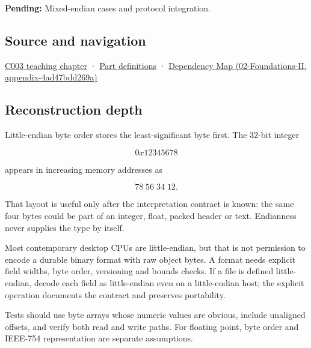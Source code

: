 \textbf{Pending:} Mixed-endian cases and protocol integration.

\subsection{Source and navigation}\label{source-and-navigation}

\href{Continuous\%20Notes/Computing\%20Foundations\%20-\%20From\%20Bits\%20to\%20C++\%20and\%20Systems\%20APIs\#Where\%20the\%20bytes\%20live}{C003 teaching chapter} · \hyperref[appendix-fd090d982a15]{Part definitions} · \href{}{Dependency Map (02-Foundations-II, appendix-4ad47bdd269a)}

\subsection{Reconstruction depth}\label{reconstruction-depth}

Little-endian byte order stores the least-significant byte first. The 32-bit integer

\[
0x12345678
\]

appears in increasing memory addresses as

\[
78\;56\;34\;12.
\]

That layout is useful only after the interpretation contract is known: the same four bytes could be part of an integer, float, packed header or text. Endianness never supplies the type by itself.

Most contemporary desktop CPUs are little-endian, but that is not permission to encode a durable binary format with raw object bytes. A format needs explicit field widths, byte order, versioning and bounds checks. If a file is defined little-endian, decode each field as little-endian even on a little-endian host; the explicit operation documents the contract and preserves portability.

Tests should use byte arrays whose numeric values are obvious, include unaligned offsets, and verify both read and write paths. For floating point, byte order and IEEE-754 representation are separate assumptions.
